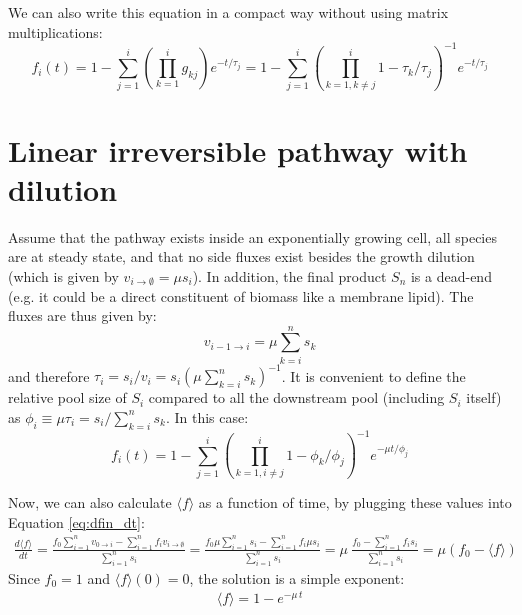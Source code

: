 \documentclass{article}
\newcommand{\fin}{\ensuremath{\langle f \rangle}}
\newcommand{\flux}[2]{\ensuremath{v_{{#1} \rightarrow {#2}}}}
\begin{document}
We can also write this equation in a compact way without using matrix multiplications:
\begin{equation}
f_i(t) = 
1 - \sum_{j=1}^{i} \left(\prod_{k=1}^{i} g_{kj}\right) e^{- t/\tau_j} = 
1 - \sum_{j=1}^{i} \left(\prod_{k = 1, k \neq j}^{i} 1 - \tau_k/\tau_j\right)^{-1} e^{- t/\tau_j}
\end{equation}

\section{Linear irreversible pathway with dilution}\label{sec:linear_examples}
Assume that the pathway exists inside an exponentially growing cell, all species are at steady state, and that no side fluxes exist besides the growth dilution (which is given by $\flux{i}{\emptyset} = \mu s_i$). In addition, the final product $S_n$ is a dead-end (e.g. it could be a direct constituent of biomass like a membrane lipid). The fluxes are thus given by:
\begin{equation}
    \flux{i-1}{i} = \mu \sum_{k=i}^n s_k
\end{equation}
and therefore $\tau_i = s_i/v_i = s_i (\mu \sum_{k=i}^n s_k)^{-1}$. It is convenient to define the relative pool size of $S_i$ compared to all the downstream pool (including $S_i$ itself) as $\phi_i \equiv \mu\tau_i = s_i / \sum_{k=i}^n s_k$. In this case:
\begin{equation}\label{eq:dilution}
    f_i(t) = 1 - \sum_{j=1}^{i} \left(\prod_{k = 1, i \neq j}^{i} 1 - \phi_k/\phi_j\right)^{-1} e^{- \mu t / \phi_j}
\end{equation}

Now, we can also calculate $\fin$ as a function of time, by plugging these values into Equation \ref{eq:dfin_dt}:
\begin{eqnarray}
	\frac{d\fin}{dt} = \frac{f_0 \sum_{i=1}^{n} \flux{0}{i} - \sum_{i=1}^{n} f_i \flux{i}{\emptyset}}{\sum_{i=1}^{n} s_i}
	= \frac{f_0 \mu \sum_{i=1}^{n} s_i - \sum_{i=1}^{n} f_i \mu s_i }{\sum_{i=1}^{n} s_i} 
	= \mu~\frac{f_0 - \sum_{i=1}^{n} f_i s_i }{\sum_{i=1}^{n} s_i} = \mu \left(f_0 - \fin\right)
\end{eqnarray}
Since $f_0 = 1$ and $\fin(0) = 0$, the solution is a simple exponent:
\begin{eqnarray}
	\fin = 1 - e^{-\mu\,t} \label{eq:fin_dilution}
\end{eqnarray}
\end{document}
